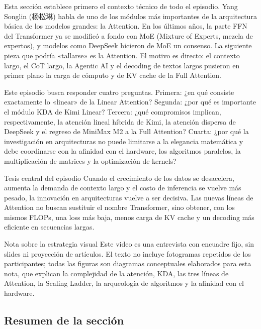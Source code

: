 \documentclass[a4paper]{article}
\begin{document}
Esta sección establece primero el contexto técnico de todo el episodio. Yang Songlin (杨松琳) habla de uno de los módulos más importantes de la arquitectura básica de los modelos grandes: la Attention. En los últimos años, la parte FFN del Transformer ya se modificó a fondo con MoE (Mixture of Experts, mezcla de expertos), y modelos como DeepSeek hicieron de MoE un consenso. La siguiente pieza que podría «tallarse» es la Attention. El motivo es directo: el contexto largo, el CoT largo, la Agentic AI y el decoding de textos largos pusieron en primer plano la carga de cómputo y de KV cache de la Full Attention.

Este episodio busca responder cuatro preguntas. Primera: ¿en qué consiste exactamente lo «linear» de la Linear Attention? Segunda: ¿por qué es importante el módulo KDA de Kimi Linear? Tercera: ¿qué compromisos implican, respectivamente, la atención lineal híbrida de Kimi, la atención dispersa de DeepSeek y el regreso de MiniMax M2 a la Full Attention? Cuarta: ¿por qué la investigación en arquitecturas no puede limitarse a la elegancia matemática y debe coordinarse con la afinidad con el hardware, los algoritmos paralelos, la multiplicación de matrices y la optimización de kernels?

\begin{importantbox}{Tesis central del episodio}
Cuando el crecimiento de los datos se desacelera, aumenta la demanda de contexto largo y el costo de inferencia se vuelve más pesado, la innovación en arquitecturas vuelve a ser decisiva. Las nuevas líneas de Attention no buscan sustituir el nombre Transformer, sino obtener, con los mismos FLOPs, una loss más baja, menos carga de KV cache y un decoding más eficiente en secuencias largas.
\end{importantbox}

\begin{knowledgebox}{Nota sobre la estrategia visual}
Este video es una entrevista con encuadre fijo, sin slides ni proyección de artículos. El texto no incluye fotogramas repetidos de los participantes; todas las figuras son diagramas conceptuales elaborados para esta nota, que explican la complejidad de la atención, KDA, las tres líneas de Attention, la Scaling Ladder, la arqueología de algoritmos y la afinidad con el hardware.
\end{knowledgebox}

\subsection{Resumen de la sección}
\end{document}
